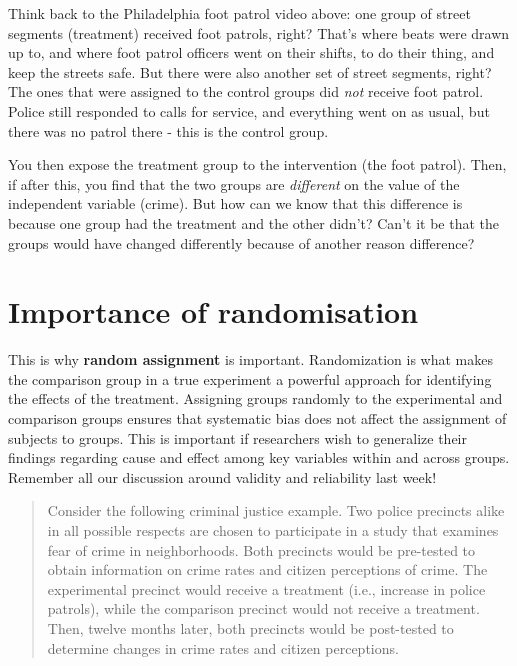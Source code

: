 \documentclass[
]{book}
\begin{document}
Think back to the Philadelphia foot patrol video above: one group of street segments (treatment) received foot patrols, right? That's where beats were drawn up to, and where foot patrol officers went on their shifts, to do their thing, and keep the streets safe. But there were also another set of street segments, right? The ones that were assigned to the control groups did \emph{not} receive foot patrol. Police still responded to calls for service, and everything went on as usual, but there was no patrol there - this is the control group.

You then expose the treatment group to the intervention (the foot patrol). Then, if after this, you find that the two groups are \emph{different} on the value of the independent variable (crime). But how can we know that this difference is because one group had the treatment and the other didn't? Can't it be that the groups would have changed differently because of another reason difference?

\hypertarget{importance-of-randomisation}{%
\section{Importance of randomisation}\label{importance-of-randomisation}}

This is why \textbf{random assignment} is important. Randomization is what makes the comparison group in a true experiment a powerful approach for identifying the effects of the treatment. Assigning groups randomly to the experimental and comparison groups ensures that systematic bias does not affect the assignment of subjects to groups. This is important if researchers wish to generalize their findings regarding cause and effect among key variables within and across groups. Remember all our discussion around validity and reliability last week!

\begin{quote}
Consider the following criminal justice example. Two police precincts alike in all possible respects are chosen to participate in a study that examines fear of crime in neighborhoods. Both precincts would be pre-tested to obtain information on crime rates and citizen perceptions of crime. The experimental precinct would receive a treatment (i.e., increase in police patrols), while the comparison precinct would not receive a treatment. Then, twelve months later, both precincts would be post-tested to determine changes in crime rates and citizen perceptions.
\end{quote}
\end{document}
